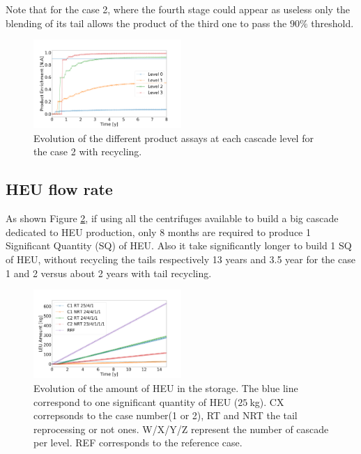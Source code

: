\documentclass{anstrans}
\begin{document}
Note that for the case 2, where the fourth stage could appear as useless only the
blending of its tail allows the product of the third one to pass the $90\%$ threshold.

\begin{figure}[ht] %
  \centering
  \includegraphics[width=0.5\textwidth]{assay_case_2_rec.png}
  \caption{Evolution of the different product assays at each cascade level for
  the case 2 with recycling.}\label{fig:assay_c2_r}
\end{figure}


\subsection{HEU flow rate}
As shown Figure \ref{fig:heu_prod}, if using all the centrifuges available to
build a big cascade dedicated to HEU production, only 8 months are required to
produce 1 Significant Quantity (SQ) of HEU. Also it take significantly longer to
build 1 SQ of HEU, without recycling the tails respectively 13 years and 3.5 year
for the case 1 and 2 versus about 2 years with tail recycling.

\begin{figure}[ht] %
  \centering
  \includegraphics[width=0.5\textwidth]{HEU_prod.png}
  \caption{Evolution of the amount of HEU in the storage. The blue line
      correspond to one significant quantity of HEU ($25~$kg). CX correpsonds to
      the case number(1 or 2), RT and NRT the tail reprocessing or not ones.
      W/X/Y/Z represent the number of cascade per level. REF corresponds to the
      reference case.}\label{fig:heu_prod}
\end{figure}
\end{document}
